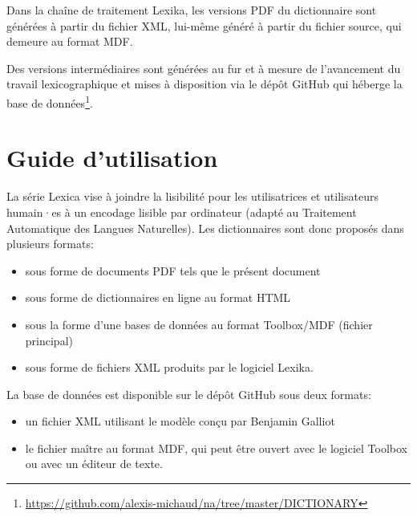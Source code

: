 
Dans la chaîne de traitement Lexika, les versions PDF du dictionnaire sont générées à partir du fichier XML, lui-même généré à partir du fichier source, qui demeure au format MDF.

Des versions intermédiaires sont générées au fur et à mesure de l'avancement du travail lexicographique et mises à disposition via le dépôt GitHub qui héberge la base de données\footnote{\url{https://github.com/alexis-michaud/na/tree/master/DICTIONARY}}.

\section{Guide d'utilisation}
\label{sec:guide}

La série Lexica vise à joindre la lisibilité pour les utilisatrices et utilisateurs humain·es à un encodage lisible par ordinateur (adapté au Traitement Automatique des Langues Naturelles). Les dictionnaires sont donc proposés dans plusieurs formats:
\begin{itemize}
    \item sous forme de documents PDF tels que le présent document
    \item sous forme de dictionnaires en ligne au format HTML
    \item sous la forme d'une bases de données au format Toolbox/MDF (fichier principal)
    \item sous forme de fichiers XML produits par le logiciel Lexika.
\end{itemize}


La base de données est disponible sur le dépôt GitHub sous deux formats:

\begin{itemize}
    \item un fichier XML utilisant le modèle conçu par Benjamin Galliot
    \item le fichier maître au format MDF, qui peut être ouvert avec le logiciel Toolbox ou avec un éditeur de texte.
\end{itemize}

